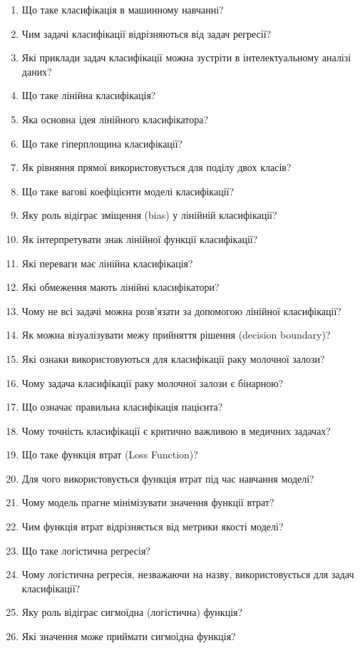 \begin{enumerate}
\item Що таке класифікація в машинному навчанні?
\item Чим задачі класифікації відрізняються від задач регресії?
\item Які приклади задач класифікації можна зустріти в інтелектуальному аналізі даних?
\item Що таке лінійна класифікація?
\item Яка основна ідея лінійного класифікатора?
\item Що таке гіперплощина класифікації?
\item Як рівняння прямої використовується для поділу двох класів?
\item Що таке вагові коефіцієнти моделі класифікації?
\item Яку роль відіграє зміщення (bias) у лінійній класифікації?
\item Як інтерпретувати знак лінійної функції класифікації?
\item Які переваги має лінійна класифікація?
\item Які обмеження мають лінійні класифікатори?
\item Чому не всі задачі можна розв'язати за допомогою лінійної класифікації?
\item Як можна візуалізувати межу прийняття рішення (decision boundary)?
\item Які ознаки використовуються для класифікації раку молочної залози?
\item Чому задача класифікації раку молочної залози є бінарною?
\item Що означає правильна класифікація пацієнта?
\item Чому точність класифікації є критично важливою в медичних задачах?
\item Що таке функція втрат (Loss Function)?
\item Для чого використовується функція втрат під час навчання моделі?
\item Чому модель прагне мінімізувати значення функції втрат?
\item Чим функція втрат відрізняється від метрики якості моделі?
\item Що таке логістична регресія?
\item Чому логістична регресія, незважаючи на назву, використовується для задач класифікації?
\item Яку роль відіграє сигмоїдна (логістична) функція?
\item Які значення може приймати сигмоїдна функція?

\end{enumerate}
